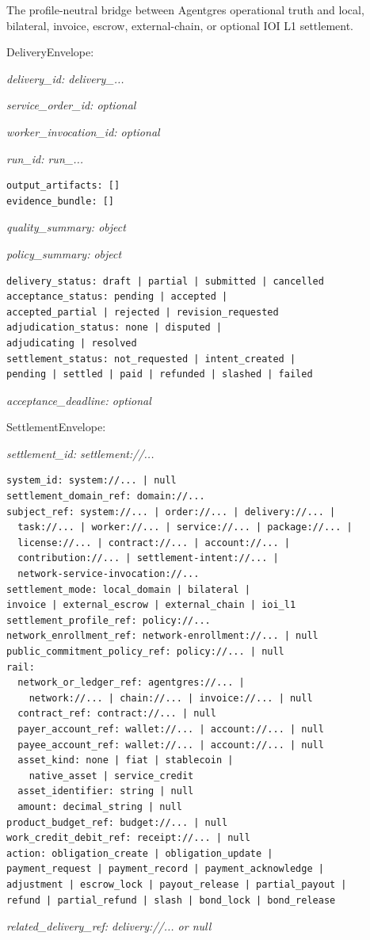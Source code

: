 \documentclass[
  11pt,
]{article}
\begin{document}
The profile-neutral bridge between Agentgres operational truth and local,
bilateral, invoice, escrow, external-chain, or optional IOI L1 settlement.

DeliveryEnvelope:

\emph{delivery\_id: delivery\_...}

\emph{service\_order\_id: optional}

\emph{worker\_invocation\_id: optional}

\emph{run\_id: run\_...}

\begin{lstlisting}[language={},basicstyle=\ttfamily\scriptsize]
output_artifacts: []
evidence_bundle: []
\end{lstlisting}
\emph{quality\_summary: object}

\emph{policy\_summary: object}

\begin{lstlisting}[language={},basicstyle=\ttfamily\scriptsize]
delivery_status: draft | partial | submitted | cancelled
acceptance_status: pending | accepted |
accepted_partial | rejected | revision_requested
adjudication_status: none | disputed |
adjudicating | resolved
settlement_status: not_requested | intent_created |
pending | settled | paid | refunded | slashed | failed
\end{lstlisting}
\emph{acceptance\_deadline: optional}

SettlementEnvelope:

\emph{settlement\_id: settlement://...}

\begin{lstlisting}[language={},basicstyle=\ttfamily\scriptsize]
system_id: system://... | null
settlement_domain_ref: domain://...
subject_ref: system://... | order://... | delivery://... |
  task://... | worker://... | service://... | package://... |
  license://... | contract://... | account://... |
  contribution://... | settlement-intent://... |
  network-service-invocation://...
settlement_mode: local_domain | bilateral |
invoice | external_escrow | external_chain | ioi_l1
settlement_profile_ref: policy://...
network_enrollment_ref: network-enrollment://... | null
public_commitment_policy_ref: policy://... | null
rail:
  network_or_ledger_ref: agentgres://... |
    network://... | chain://... | invoice://... | null
  contract_ref: contract://... | null
  payer_account_ref: wallet://... | account://... | null
  payee_account_ref: wallet://... | account://... | null
  asset_kind: none | fiat | stablecoin |
    native_asset | service_credit
  asset_identifier: string | null
  amount: decimal_string | null
product_budget_ref: budget://... | null
work_credit_debit_ref: receipt://... | null
action: obligation_create | obligation_update |
payment_request | payment_record | payment_acknowledge |
adjustment | escrow_lock | payout_release | partial_payout |
refund | partial_refund | slash | bond_lock | bond_release
\end{lstlisting}
\emph{related\_delivery\_ref: delivery://... or null}
\end{document}
